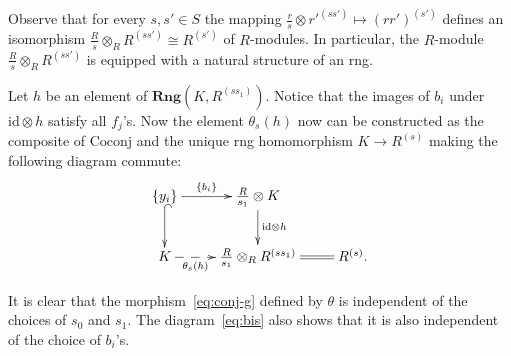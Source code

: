 \documentclass[oneside, 11pt]{amsart}
\numberwithin{equation}{section}
\theoremstyle{definition}
\theoremstyle{remark}
\newcommand{\Rng}{\mathbf{Rng}}
\begin{document}
Observe that for every \(s, s' \in S\) the mapping $ \frac rs \otimes {r'}^{(ss')} \mapsto (rr')^{(s')}$ defines an isomorphism \(\frac Rs \otimes_R R^{(ss')} \cong R^{(s')}\) of $R$-modules. In particular, the \(R\)-module \(\frac Rs \otimes_R R^{(ss')}\) is equipped with a natural structure of an rng.

Let $h$ be an element of $\Rng(K, R^{(ss_1)})$.
Notice that the images of $b_i$ under $\mathrm{id}\otimes h$ satisfy all $f_j$'s.
Now the element $\theta_s(h)$ now can be constructed as the composite of $\mathrm{Coconj}$ and the unique rng homomorphism $K \to R^{(s)}$ making the following diagram commute:
\[ \xymatrix{ \{ y_i\} \ar@{^{(}->}[d] \ar[r]^(0.45){\{b_i\}} & \tfrac R {s_1} \otimes K \ar[d]^{\mathrm{id} \otimes h} \\
               K \ar@{-->}[r]_(0.33){\theta_s(h)} & \tfrac R {s_1} \otimes_R R^{(ss_1)} \ar@{=}[r] & R^{(s)}. } \]

It is clear that the morphism~\eqref{eq:conj-g} defined by $\theta$ is independent of the choices of $s_0$ and $s_1$. The diagram~\eqref{eq:bis} also shows that it is also independent of the choice of $b_i$'s.
\end{document}
